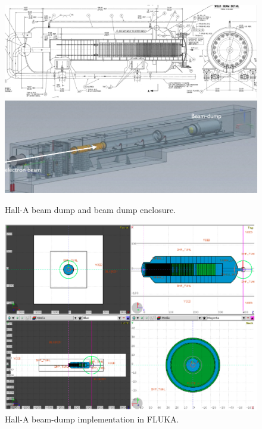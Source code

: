 \begin{figure}[h!] 
\center
\includegraphics[width=12.5cm]{figs/beam-dump-br.pdf}
\includegraphics[width=12.5cm]{figs/beam-dump.pdf}
\caption{Hall-A beam dump and beam dump enclosure. }
\label{fig:bd}
\end{figure}
\begin{figure}[h!] 
\center
\includegraphics[width=14.5cm]{figs/fluka-bd.pdf}
\caption{Hall-A beam-dump implementation in FLUKA. }
\label{fig:fluka-bd}
\end{figure}
